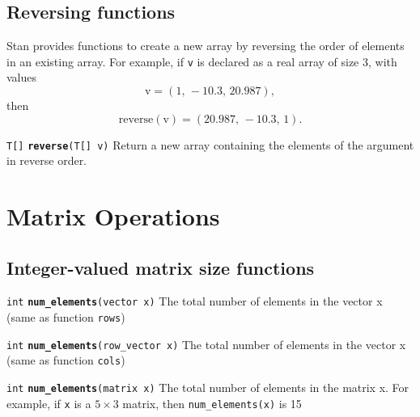 \documentclass[
  10pt,
]{book}
\begin{document}
\hypertarget{reversing-functions}{%
\section{Reversing functions}\label{reversing-functions}}

Stan provides functions to create a new array by reversing the order of
elements in an existing array. For example, if \texttt{v} is declared as a real
array of size 3, with values
\[ \text{v} = (1,\, -10.3,\, 20.987), \] then
\[ \mathrm{reverse(v)} = (20.987,\, -10.3,\, 1). \]


\texttt{T{[}{]}} \textbf{\texttt{reverse}}\texttt{(T{[}{]}\ v)}\newline
Return a new array containing the elements of the argument in reverse order.

\hypertarget{matrix-operations}{%
\chapter{Matrix Operations}\label{matrix-operations}}

\hypertarget{integer-valued-matrix-size-functions}{%
\section{Integer-valued matrix size functions}\label{integer-valued-matrix-size-functions}}


\texttt{int} \textbf{\texttt{num\_elements}}\texttt{(vector\ x)}\newline
The total number of elements in the vector x (same as function \texttt{rows})


\texttt{int} \textbf{\texttt{num\_elements}}\texttt{(row\_vector\ x)}\newline
The total number of elements in the vector x (same as function \texttt{cols})


\texttt{int} \textbf{\texttt{num\_elements}}\texttt{(matrix\ x)}\newline
The total number of elements in the matrix x. For example, if \texttt{x} is a
\(5 \times 3\) matrix, then \texttt{num\_elements(x)} is 15
\end{document}
